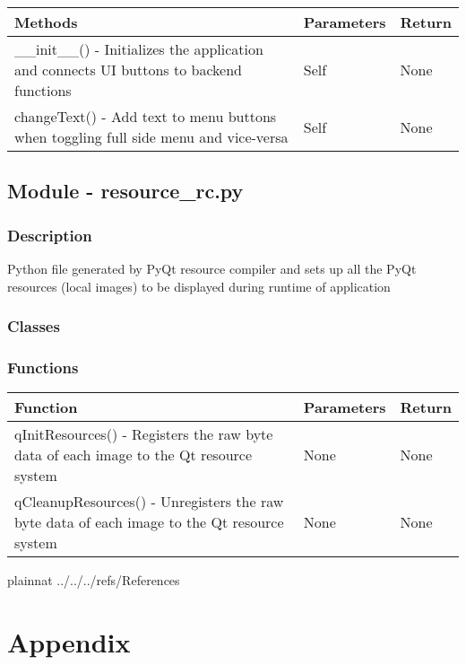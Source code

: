 \documentclass[12pt, titlepage]{article}
\begin{document}
    \noindent \begin{tabular}{| p{} | p{}| p{}|}
      \hline
      \rowcolor[gray]{0.9}
      Methods & Parameters & Return\\
      \hline
      \_\_init\_\_() - Initializes the application and connects UI buttons to backend functions &  Self & None \\
      \hline
      changeText() - Add text to menu buttons when toggling full side menu and vice-versa & Self & None \\
      \hline
    \end{tabular}

  \subsection{Module - resource\_rc.py}

  \subsubsection{Description}
  Python file generated by PyQt resource compiler and sets up all the PyQt resources (local images) to be displayed during runtime of application
  
  \subsubsection{Classes}

  \subsubsection{Functions}
  
    \noindent \begin{tabular}{| p{} | p{}| p{}|}
      \hline
      \rowcolor[gray]{0.9}
      Function & Parameters & Return\\
      \hline
      qInitResources() - Registers the raw byte data of each image to the Qt resource system &  None & None \\
      \hline
      qCleanupResources() - Unregisters the raw byte data of each image to the Qt resource system & None & None \\
      \hline
    \end{tabular}


\newpage

 {plainnat}
 {../../../refs/References}

\newpage

\section{Appendix} \label{Appendix}

\end{document}
